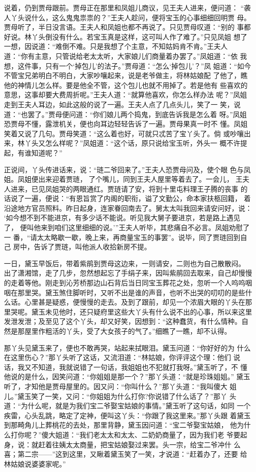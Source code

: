 说着，仍到贾母跟前。贾母正在那里和凤姐儿商议，见王夫人进来，便问道：
“袭人丫头说什么，这么鬼鬼祟祟的？”王夫人趁问，便将宝玉的心事细细回明贾
母。贾母听了，半日没言语。王夫人和凤姐也都不再说了。只见贾母叹道：“别的
事都好说。林丫头倒没有什么。若宝玉真是这样，这可叫人作了难了。”只见凤姐
想了一想，因说道：“难倒不难。只是我想了个主意，不知姑妈肯不肯。”王夫人
道：“你有主意，只管说给老太太听，大家娘儿们商量着办罢了。”凤姐道：“依
我想，这件事，只有一个‘掉包儿’的法子。”贾母道：“怎么‘掉包儿’？”凤
姐道：“如今不管宝兄弟明白不明白，大家吵嚷起来，说是老爷做主，将林姑娘配
了他了，瞧他的神情儿怎么样。要是他全不管，这个包儿也就不用掉了。若是他有
些喜欢的意思，这事却要大费周折呢。”王夫人道：“就算他喜欢，你怎么样办法
呢？”凤姐走到王夫人耳边，如此这般的说了一遍。王夫人点了几点头儿，笑了一
笑，说道：“也罢了。”贾母便问道：“你们娘儿两个捣鬼，到底告诉我是怎么着
呀。”凤姐恐贾母不懂，露泄机关，便也向耳边轻轻告诉了一遍。贾母果真一时不
懂。凤姐笑着又说了几句。贾母笑道：“这么着也好，可就只忒苦了宝丫头了。倘
或吵嚷出来，林丫头又怎么样呢？”凤姐道：“这个话，原只说给宝玉听，外头一
概不许提起，有谁知道呢？”

正说间，丫头传进话来，说：“琏二爷回来了。”王夫人恐贾母问及，使个眼
色与凤姐。凤姐便出来迎着贾琏，了个嘴儿，同到王夫人屋里等着去了。一会儿，
王夫人进来，已见凤姐哭的两眼通红。贾琏请了安，将到十里屯料理王子腾的丧事
的话说了一遍，便说：“有恩旨赏了内阁的职衔，谥了文勤公，命本家扶柩回籍，
着沿途地方官员照料。昨日起身，连家眷回南去了。舅太太叫我回来请安问好，说：
‘如今想不到不能进京，有多少话不能说。听见我大舅子要进京，若是路上遇见了，
便叫他来到咱们这里细细的说。’”王夫人听毕，其悲痛自不必言。凤姐劝慰了一
番，“请太太略歇一歇，晚上来，再商量宝玉的事罢”。说毕，同了贾琏回到自己
房中，告诉了贾琏，叫他派人收拾新房不提。

一日，黛玉早饭后，带着紫鹃到贾母这边来，一则请安，二则也为自己散散闷。
出了潇湘馆，走了几步，忽然想起忘了手绢子来，因叫紫鹃回去取来，自己却慢慢
的走着等他。刚走到沁芳桥那边山石背后当日同宝玉葬花之处，忽听一个人呜呜咽
咽在那里哭。黛玉煞住脚听时，又听不出是谁的声音，也听不出哭的叨叨的是些什
么话。心里甚是疑惑，便慢慢的走去。及到了跟前，却见一个浓眉大眼的丫头在那
里哭呢。黛玉未见他时，还只疑府里这些大丫头有什么说不出的心事，所以来这里
发泄发泄；及至见了这个丫头，却又好笑，因想到：“这种蠢货，有什么情种。自
然是那屋里作粗活的丫头，受了大女孩子的气了。”细瞧了一瞧，却不认得。

那丫头见黛玉来了，便也不敢再哭，站起来拭眼泪。黛玉问道：“你好好的为
什么在这里伤心？”那丫头听了这话，又流泪道：“林姑娘，你评评这个理：他们
说话，我又不知道，我就说错了一句话，我姐姐也不犯就打我呀。”黛玉听了，不
懂他说的是什么，因笑问道：“你姐姐是那一个？”那丫头道：“就是珍珠姐姐。”
黛玉听了，才知他是贾母屋里的。因又问：“你叫什么？”那丫头道：“我叫傻大
姐儿。”黛玉笑了一笑，又问：“你姐姐为什么打你?你说错了什么话了？”那丫
头道：“为什么呢，就是为我们宝二爷娶宝姑娘的事情。”黛玉听了这句话，如同
一个疾雷，心头乱跳，略定了定神，便叫这丫头：“你跟了我这里来。”那丫头跟
着黛玉到那畸角儿上葬桃花的去处，那里背静，黛玉因问道：“宝二爷娶宝姑娘，
他为什么打你呢？”傻大姐道：“我们老太太和太太、二奶奶商量了，因为我们老
爷要起身，说：就赶着往姨太太商量，把宝姑娘娶过来罢。头一宗，给宝二爷冲什
么喜；第二宗——”这到这里，又瞅着黛玉笑了一笑，才说道：“赶着办了，还要
给林姑娘说婆婆家呢。”

